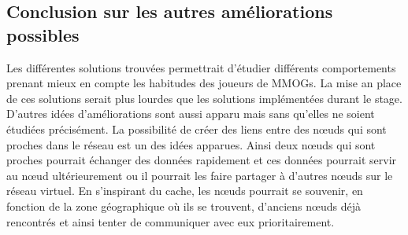 \subsection{Conclusion sur les autres améliorations possibles}

Les différentes solutions trouvées permettrait d'étudier différents comportements prenant mieux en compte les habitudes des joueurs de MMOGs. La mise an place de ces solutions serait plus lourdes que les solutions implémentées durant le stage. 
D'autres idées d'améliorations sont aussi apparu mais sans qu'elles ne soient étudiées précisément. La possibilité de créer des liens entre des nœuds qui sont proches dans le réseau est un des idées apparues. Ainsi deux nœuds qui sont proches pourrait échanger des données rapidement et ces données pourrait servir au nœud ultérieurement ou il pourrait les faire partager à d'autres nœuds sur le réseau virtuel. En s'inspirant du cache, les nœuds pourrait se souvenir, en fonction de la zone géographique où ils se trouvent, d'anciens nœuds déjà rencontrés et ainsi tenter de communiquer avec eux prioritairement.




